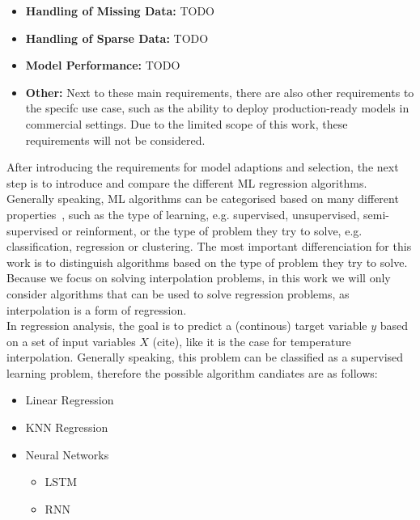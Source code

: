 \begin{itemize}
    \item \textbf{Handling of Missing Data:} TODO
    \item \textbf{Handling of Sparse Data:} TODO
    \item \textbf{Model Performance:} TODO
    \item \textbf{Other:} Next to these main requirements, there are also other requirements to the specifc use case, such as the ability to deploy production-ready models in commercial settings. Due to the limited scope of this work, these requirements will not be considered.
\end{itemize}

After introducing the requirements for model adaptions and selection, the next step is to introduce and compare the different ML regression algorithms.
Generally speaking, ML algorithms can be categorised based on many different properties~\cite{sarker2021machine}, such as the type of learning, e.g. supervised, unsupervised, semi-supervised or reinforment, or the type of problem they try to solve, e.g. classification, regression or clustering. The most important differenciation for this work is to distinguish algorithms based on the type of problem they try to solve. Because we focus on solving interpolation problems, in this work we will only consider algorithms that can be used to solve regression problems, as interpolation is a form of regression.\\
In regression analysis, the goal is to predict a (continous) target variable $y$ based on a set of input variables $X$ (cite), like it is the case for temperature interpolation. Generally speaking, this problem can be classified as a supervised learning problem, therefore the possible algorithm candiates are as follows:

\begin{itemize}
    \item Linear Regression
    \item KNN Regression
    \item Neural Networks

    \begin{itemize}
        \item LSTM
        \item RNN
    \end{itemize}
\end{itemize}

